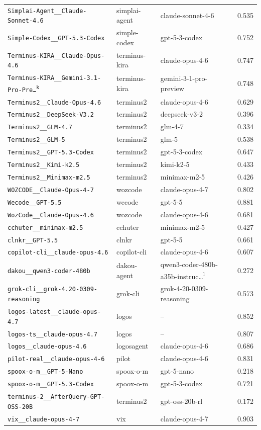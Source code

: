 \begin{center}
\begin{longtable}{lllc}
\texttt{Simplai-Agent\_\_Claude-Sonnet-4.6} & simplai-agent & claude-sonnet-4-6 & 0.535 \\
\texttt{Simple-Codex\_\_GPT-5.3-Codex} & simple-codex & gpt-5-3-codex & 0.752 \\
\texttt{Terminus-KIRA\_\_Claude-Opus-4.6} & terminus-kira & claude-opus-4-6 & 0.747 \\
\texttt{Terminus-KIRA\_\_Gemini-3.1-Pro-Pre\ldots\textsuperscript{k}} & terminus-kira & gemini-3-1-pro-preview & 0.748 \\
\texttt{Terminus2\_\_Claude-Opus-4.6} & terminus2 & claude-opus-4-6 & 0.629 \\
\texttt{Terminus2\_\_DeepSeek-V3.2} & terminus2 & deepseek-v3-2 & 0.396 \\
\texttt{Terminus2\_\_GLM-4.7} & terminus2 & glm-4-7 & 0.334 \\
\texttt{Terminus2\_\_GLM-5} & terminus2 & glm-5 & 0.538 \\
\texttt{Terminus2\_\_GPT-5.3-Codex} & terminus2 & gpt-5-3-codex & 0.647 \\
\texttt{Terminus2\_\_Kimi-k2.5} & terminus2 & kimi-k2-5 & 0.433 \\
\texttt{Terminus2\_\_Minimax-m2.5} & terminus2 & minimax-m2-5 & 0.426 \\
\texttt{WOZCODE\_\_Claude-Opus-4-7} & wozcode & claude-opus-4-7 & 0.802 \\
\texttt{Wecode\_\_GPT-5.5} & wecode & gpt-5-5 & 0.881 \\
\texttt{WozCode\_\_Claude-Opus-4.6} & wozcode & claude-opus-4-6 & 0.681 \\
\texttt{cchuter\_\_minimax-m2.5} & cchuter & minimax-m2-5 & 0.427 \\
\texttt{clnkr\_\_GPT-5.5} & clnkr & gpt-5-5 & 0.661 \\
\texttt{copilot-cli\_\_claude-opus-4.6} & copilot-cli & claude-opus-4-6 & 0.607 \\
\texttt{dakou\_\_qwen3-coder-480b} & dakou-agent & qwen3-coder-480b-a35b-instruc\ldots\textsuperscript{l} & 0.272 \\
\texttt{grok-cli\_\_grok-4.20-0309-reasoning} & grok-cli & grok-4-20-0309-reasoning & 0.573 \\
\texttt{logos-latest\_\_claude-opus-4.7} & logos & -- & 0.852 \\
\texttt{logos-ts\_\_claude-opus-4.7} & logos & -- & 0.807 \\
\texttt{logos\_\_claude-opus-4.6} & logosagent & claude-opus-4-6 & 0.686 \\
\texttt{pilot-real\_\_claude-opus-4-6} & pilot & claude-opus-4-6 & 0.831 \\
\texttt{spoox-o-m\_\_GPT-5-Nano} & spoox-o-m & gpt-5-nano & 0.218 \\
\texttt{spoox-o-m\_\_GPT-5.3-Codex} & spoox-o-m & gpt-5-3-codex & 0.721 \\
\texttt{terminus-2\_\_AfterQuery-GPT-OSS-20B} & terminus2 & gpt-oss-20b-rl & 0.172 \\
\texttt{vix\_\_claude-opus-4-7} & vix & claude-opus-4-7 & 0.903 \\
\end{longtable}
\end{center}

